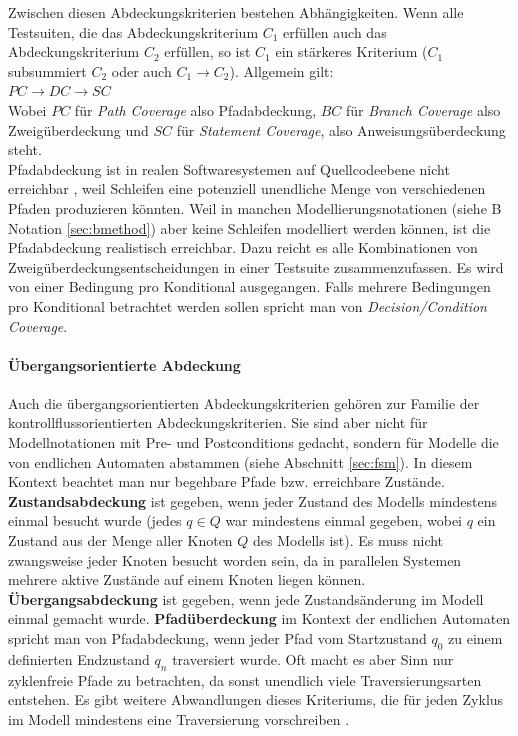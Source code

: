 Zwischen diesen Abdeckungskriterien bestehen Abhängigkeiten. Wenn alle Testsuiten, die das Abdeckungskriterium $C_1$ erfüllen auch das Abdeckungskriterium $C_2$ erfüllen, so ist $C_1$ ein stärkeres Kriterium ($C_1$ subsummiert $C_2$ oder auch $C_1 \longrightarrow C_2$). Allgemein gilt:\\
$ PC \longrightarrow DC \longrightarrow SC $\\
Wobei $PC$ für \textit{Path Coverage} also Pfadabdeckung, $BC$ für \textit{Branch Coverage} also Zweigüberdeckung und $SC$ für \textit{Statement Coverage}, also Anweisungsüberdeckung steht.\\
Pfadabdeckung ist in realen Softwaresystemen auf Quellcodeebene nicht erreichbar \cite{utting_practical_2007}, weil Schleifen eine potenziell unendliche Menge von verschiedenen Pfaden produzieren könnten. Weil in manchen Modellierungsnotationen (siehe B Notation \ref{sec:bmethod}) aber keine Schleifen modelliert werden können, ist die Pfadabdeckung realistisch erreichbar. Dazu reicht es alle Kombinationen von Zweigüberdeckungsentscheidungen in einer Testsuite zusammenzufassen. Es wird von einer Bedingung pro Konditional ausgegangen. Falls mehrere Bedingungen pro Konditional betrachtet werden sollen spricht man von \textit{Decision/Condition Coverage}.

\paragraph{Übergangsorientierte Abdeckung}\label{coverage_transition}
Auch die übergangsorientierten Abdeckungskriterien gehören zur Familie der kontrollflussorientierten Abdeckungskriterien. Sie sind aber nicht für Modellnotationen mit Pre- und Postconditions gedacht, sondern für Modelle die von endlichen Automaten abstammen (siehe Abschnitt \ref{sec:fsm}). In diesem Kontext beachtet man nur begehbare Pfade bzw. erreichbare Zustände.\\

\textbf{Zustandsabdeckung} ist gegeben, wenn jeder Zustand des Modells mindestens einmal besucht wurde (jedes $q \in Q$ war mindestens einmal gegeben, wobei $q$ ein Zustand aus der Menge aller Knoten $Q$ des Modells ist). Es muss nicht zwangsweise jeder Knoten besucht worden sein, da in parallelen Systemen mehrere aktive Zustände auf einem Knoten liegen können.
\textbf{Übergangsabdeckung} ist gegeben, wenn jede Zustandsänderung im Modell einmal gemacht wurde.
\textbf{Pfadüberdeckung} im Kontext der endlichen Automaten spricht man von Pfadabdeckung, wenn jeder Pfad vom Startzustand $q_0$ zu einem definierten Endzustand $q_n$ traversiert wurde. Oft macht es aber Sinn nur zyklenfreie Pfade zu betrachten, da sonst unendlich viele Traversierungsarten entstehen. Es gibt weitere Abwandlungen dieses Kriteriums, die für jeden Zyklus im Modell mindestens eine Traversierung vorschreiben \cite{utting_practical_2007}.

